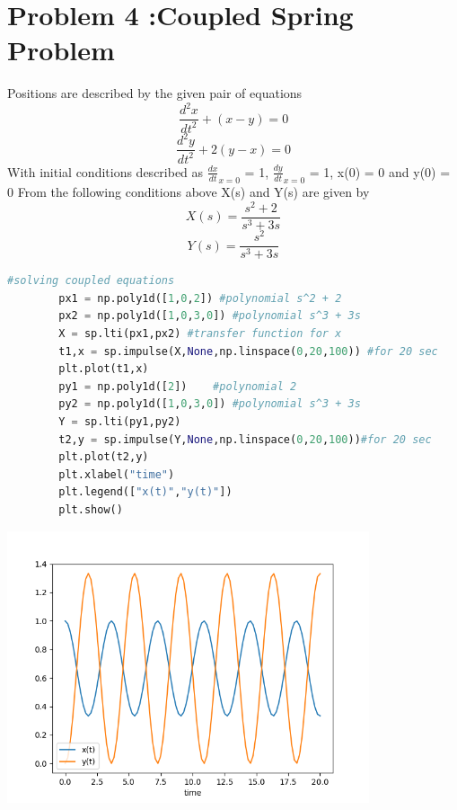 \documentclass[a4paper]{article}
\begin{document}
\section{Problem 4 :Coupled Spring Problem}
Positions are described by the given pair of equations
	$$ \frac{d^{2}x}{dt^{2}} + (x - y) = 0$$
	$$ \frac{d^{2}y}{dt^{2}} + 2(y - x) = 0$$
With initial conditions described as $\frac{dx}{dt}_{x=0}$ = 1, $\frac{dy}{dt}_{x=0}$ = 1, x(0) = 0 and y(0) = 0
From the following conditions above X(s) and Y(s) are given by
$$ X(s) = \frac{s^{2} + 2}{s^{3} + 3s}$$
$$ Y(s) = \frac{s^{2}}{s^{3} + 3s}$$
\begin{lstlisting}[language=Python]
#solving coupled equations
		px1 = np.poly1d([1,0,2]) #polynomial s^2 + 2		
		px2 = np.poly1d([1,0,3,0]) #polynomial s^3 + 3s
		X = sp.lti(px1,px2) #transfer function for x
		t1,x = sp.impulse(X,None,np.linspace(0,20,100)) #for 20 sec
		plt.plot(t1,x)
		py1 = np.poly1d([2])	#polynomial 2	
		py2 = np.poly1d([1,0,3,0]) #polynomial s^3 + 3s
		Y = sp.lti(py1,py2)
		t2,y = sp.impulse(Y,None,np.linspace(0,20,100))#for 20 sec
		plt.plot(t2,y)
		plt.xlabel("time")
		plt.legend(["x(t)","y(t)"])
		plt.show()
\end{lstlisting}
\begin{center}
\includegraphics[width=0.8\textwidth]{Figure_4.png}
\end{center}
\end{document}
